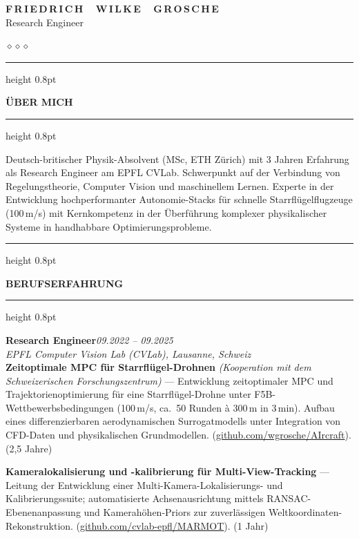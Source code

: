 \documentclass[a4paper,10pt]{article}
\newlength{\mainwidth}
\newlength{\mainpadding}
\newcommand{\mainsection}[1]{%
  \vspace{14pt}%
  {\color{ruleColor}\hrule height 0.8pt}%
  \vspace{6pt}%
  {\color{mainHeading}\bfseries\large\MakeUppercase{#1}}%
  \vspace{4pt}%
  {\color{ruleColor}\hrule height 0.8pt}%
  \vspace{8pt}\par%
}
\newcommand{\divider}{%
  \begin{center}%
    \vspace{2pt}%
    {\color{mainLight}\small$\diamond$\hspace{6pt}$\diamond$\hspace{6pt}$\diamond$}%
    \vspace{2pt}%
  \end{center}%
}
\begin{document}
%
\begin{minipage}[t][\textheight]{\mainwidth}
  \hspace{\mainpadding}%
  \begin{minipage}[t]{\dimexpr\mainwidth-2\mainpadding\relax}
    \vspace{0.7cm}

    \begin{center}
      {\color{mainHeading}\fontsize{28}{32}\selectfont\bfseries
       F\,R\,I\,E\,D\,R\,I\,C\,H~~\,W\,I\,L\,K\,E~~\,G\,R\,O\,S\,C\,H\,E}\\[6pt]
      {\color{mainLight}\normalsize Research Engineer}
    \end{center}
    \divider

    \mainsection{\"Uber mich}
    {\color{mainText}\small
      Deutsch-britischer Physik-Absolvent (MSc, ETH Z\"urich) mit 3 Jahren Erfahrung als Research
      Engineer am EPFL CVLab. Schwerpunkt auf der Verbindung von Regelungstheorie, Computer
      Vision und maschinellem Lernen. Experte in der Entwicklung hochperformanter
      Autonomie-Stacks f\"ur schnelle Starrfl\"ugelflugzeuge (100\,m/s) mit Kernkompetenz in der
      \"Uberf\"uhrung komplexer physikalischer Systeme in handhabbare Optimierungsprobleme.
    }

    \mainsection{Berufserfahrung}

    {\color{mainHeading}\bfseries Research Engineer}\hfill{\color{mainLight}\small\itshape 09.2022 -- 09.2025}\\[1pt]
    {\color{sidebarAccent}\small\itshape EPFL Computer Vision Lab (CVLab), Lausanne, Schweiz}\\[6pt]

    {\color{mainText}\small
      \textbf{Zeitoptimale MPC f\"ur Starrfl\"ugel-Drohnen}
      \textit{(Kooperation mit dem Schweizerischen Forschungszentrum)} ---
      Entwicklung zeitoptimaler MPC und Trajektorienoptimierung f\"ur eine Starrfl\"ugel-Drohne
      unter F5B-Wettbewerbsbedingungen (100\,m/s, ca.\ 50 Runden \`a 300\,m in 3\,min). Aufbau
      eines differenzierbaren aerodynamischen Surrogatmodells unter Integration von
      CFD-Daten und physikalischen Grundmodellen.
      (\href{https://github.com/wgrosche/AIrcraft}{github.com/wgrosche/AIrcraft}).
      (2{,}5 Jahre)
    }
    \vspace{6pt}

    {\color{mainText}\small
      \textbf{Kameralokalisierung und -kalibrierung f\"ur Multi-View-Tracking} ---
      Leitung der Entwicklung einer Multi-Kamera-Lokalisierungs- und Kalibrierungssuite;
      automatisierte Achsenausrichtung mittels RANSAC-Ebenenanpassung und Kamerah\"ohen-Priors
      zur zuverl\"assigen Weltkoordinaten-Rekonstruktion.
      (\href{https://github.com/cvlab-epfl/MARMOT}{github.com/cvlab-epfl/MARMOT}). (1 Jahr)
    }
    \vspace{6pt}


\end{minipage}
\end{minipage}
\end{document}
